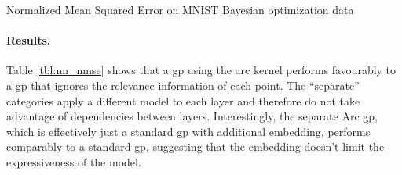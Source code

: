 \documentclass{article}
\newcommand{\note}[1]{}
\newcommand{\gp}{{\sc gp}}
\begin{document}
%
%



\begin{table}[h!]
\caption{{\small Normalized Mean Squared Error on MNIST Bayesian optimization data\label{tab:nn_error}}}
\label{tbl:nn_nmse}

%
\vspace{-0.3cm}
\end{table}

\paragraph{Results.}
Table \ref{tbl:nn_nmse} shows that a \gp{} using the arc kernel performs favourably to a \gp{} that ignores the relevance information of each point. The ``separate'' categories apply a different model to each layer and therefore do not take advantage of dependencies between layers. Interestingly, the separate Arc \gp{}, which is effectively just a standard \gp{} with additional embedding, performs comparably to a standard \gp{}, suggesting that the embedding doesn't limit the expressiveness of the model.
\end{document}

